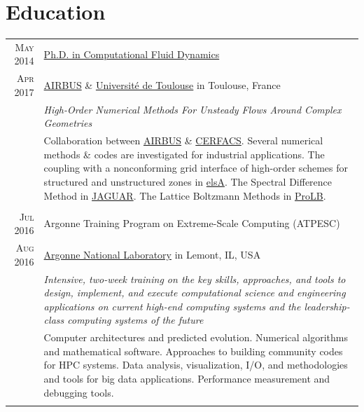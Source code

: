 \documentclass[a4paper,10pt]{article}
\begin{document}
\section{Education}
\begin{tabular}{r|p{15cm}}
            \textsc{May 2014} & \href{https://jvanhare.github.io/pdf/PhD_Vanharen_2017.pdf}{Ph.D. in Computational Fluid Dynamics}                                          \\
    \textsc{Apr 2017}   & \href{https://www.airbus.com}{AIRBUS} \& \href{https://www.univ-toulouse.fr/}{Université de Toulouse} in Toulouse, France \\
                   & \emph{High-Order Numerical Methods For Unsteady Flows Around Complex Geometries}                                                                                                                                  \\                    & \footnotesize{Collaboration between \href{https://www.airbus.com}{AIRBUS} \& \href{https://cerfacs.fr}{CERFACS}. Several numerical methods \& codes are investigated for industrial applications. The coupling with a nonconforming grid interface of high-order schemes for structured and unstructured zones in \href{http://elsa.onera.fr}{elsA}. The Spectral Difference Method in \href{http://gpuigt.free.fr/jaguar.html}{JAGUAR}. The Lattice Boltzmann Methods in \href{http://www.prolb-cfd.com/}{ProLB}. }                                                                                 \\    \multicolumn{2}{c}{}                                                                                                                                                                                           \\
                \textsc{Jul 2016} & Argonne Training Program on Extreme-Scale Computing (ATPESC)                                          \\
    \textsc{Aug 2016}   &  \href{https://extremecomputingtraining.anl.gov}{Argonne National Laboratory} in Lemont, IL, USA \\
                   & \emph{Intensive, two-week training on the key skills, approaches, and tools to design, implement, and execute computational science and engineering applications on current high-end computing systems and the leadership-class computing systems of the future}                                                                                                                                  \\                    & \footnotesize{Computer architectures and predicted evolution. Numerical algorithms and mathematical software. Approaches to building community codes for HPC systems. Data analysis, visualization, I/O, and methodologies and tools for big data applications. Performance measurement and debugging tools. }                                                                                 \\    \multicolumn{2}{c}{}                                                                                                                                                                                           \\

\end{tabular}
\end{document}
